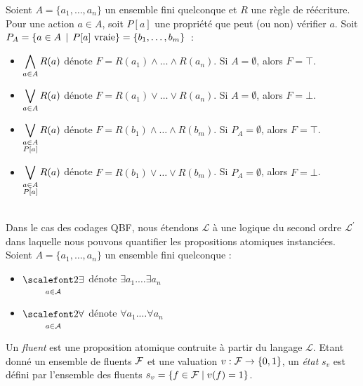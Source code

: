Soient $A=\{a_1, \ldots, a_n\}$ un ensemble fini quelconque et $R$ une règle de
réécriture.  Pour une action $a\in A$, soit $P[a]$ une propriété que peut (ou
non) vérifier $a$. Soit $P_A=\{a\in A \,\mid\, P[a]\
\mathrm{vraie}\}=\{b_1,\ldots,b_m\}$~:
\begin{itemize}
\item $\displaystyle\bigwedge\limits_{\substack{a\in A}} R(a)$ dénote $F=R(a_1) \land\ldots\land R(a_n)$. Si $A=\emptyset$, alors $F=\top$.
\item $\displaystyle\bigvee\limits_{\substack{a\in A}} R(a)$ dénote $F=R(a_1) \lor\ldots\lor R(a_n)$. Si $A=\emptyset$, alors $F=\bot$.
\item $\displaystyle\bigvee\limits_{\substack{\substack{a\in A \\ P[a]}}} R(a)$ dénote $F=R(b_1) \land\ldots\land R(b_m)$. Si $P_A=\emptyset$, alors $F=\top$.
\item $\displaystyle\bigvee\limits_{\substack{\substack{a\in A \\ P[a]}}} R(a)$ dénote $F=R(b_1) \lor\ldots\lor R(b_m)$. Si $P_A=\emptyset$, alors $F=\bot$.
\end{itemize}~\\
Dans le cas des codages QBF, nous étendons $\mathcal{L}$ à une logique du second ordre $\mathcal{L}^{\prime}$ dans laquelle nous pouvons quantifier les propositions atomiques instanciées. Soient $A=\{a_1, \ldots, a_n\}$ un ensemble fini quelconque :
\begin{itemize}
\item $\displaystyle\bigexists_{\a \in \A}$ dénote $\exists a_1. \ldots \exists a_n$
\item $\displaystyle\bigforall_{\a \in \A}$ dénote $\forall a_1. \ldots \forall a_n$
\end{itemize}


\begin{definition}
Un \emph{fluent} est une proposition atomique contruite à partir du langage $\mathcal{L}$. Etant donné un ensemble de fluents $\mathcal{F}$ et une valuation $v: \mathcal{F} \rightarrow \{0,1\}$, un \emph{état} $s_{v}$ est défini par l'ensemble des fluents $s_{v}=\{f\in\mathcal{F} \mid v(f)=1\}$.
\end{definition}

